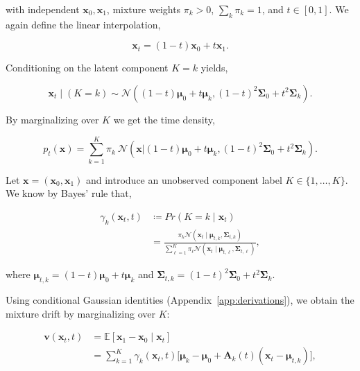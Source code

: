 with independent $\mathbf{x}_0, \mathbf{x}_1$, mixture weights $\pi_k > 0$, $\sum_k \pi_k = 1$, and $t \in [0,1]$. We again define the linear interpolation,

$$
\mathbf{x}_t = (1-t) \mathbf{x}_0 + t \mathbf{x}_1.
$$

Conditioning on the latent component $K=k$ yields,

$$
\mathbf{x}_t \mid (K=k) \sim \mathcal N\left((1-t) \boldsymbol \mu_0 + t \boldsymbol \mu_k, (1-t)^2 \boldsymbol \Sigma_0 + t^2 \boldsymbol \Sigma_k \right).
$$

By marginalizing over $K$ we get the time density,

$$
p_t(\mathbf{x}) = \sum_{k=1}^K \pi_k \ \mathcal N\left(\mathbf{x} | (1-t) \boldsymbol \mu_0 + t \boldsymbol \mu_k, (1-t)^2 \boldsymbol \Sigma_0 + t^2 \boldsymbol \Sigma_k \right).
$$

Let $\mathbf{x} = (\mathbf{x}_0, \mathbf{x}_1)$ and introduce an unobserved component label $K \in \{1, \ldots, K \}$. We know by Bayes' rule that, \vspace{-1em}

\begin{equation}
\label{eq:mixture_responsibilities}
\begin{aligned}
\gamma_k(\mathbf{x}_t,t) & \coloneqq Pr(K = k \mid \mathbf{x}_t) \\
& = \frac{\pi_k \mathcal{N}(\mathbf{x}_t \mid \boldsymbol{\mu}_{t,k}, \boldsymbol{\Sigma}_{t,k})}{\sum_{\ell=1}^K \pi_\ell \mathcal{N}(\mathbf{x}_t \mid \boldsymbol{\mu}_{t,\ell}, \boldsymbol{\Sigma}_{t,\ell})},
\end{aligned}
\end{equation}

where $\boldsymbol{\mu}_{t,k} = (1-t) \boldsymbol{\mu}_0 + t \boldsymbol{\mu}_k$ and $\boldsymbol{\Sigma}_{t,k} = (1-t)^2 \boldsymbol{\Sigma}_0 + t^2 \boldsymbol{\Sigma}_k$.

Using conditional Gaussian identities (Appendix~\ref{app:derivations}), we obtain the mixture drift by marginalizing over $K$:

\begin{equation}
\label{eq:mixture_gaussian}
\begin{aligned}
\mathbf{v}(\mathbf{x}_t,t) 
& = \mathbb{E}[\mathbf{x}_1 - \mathbf{x}_0 \mid \mathbf{x}_t] \\
& = \sum_{k=1}^K \gamma_k(\mathbf{x}_t,t) \bigl[
    \boldsymbol{\mu}_k - \boldsymbol{\mu}_0 
    + \mathbf{A}_k(t) (\mathbf{x}_t - \boldsymbol{\mu}_{t,k})
\bigr],
\end{aligned}
\end{equation}

